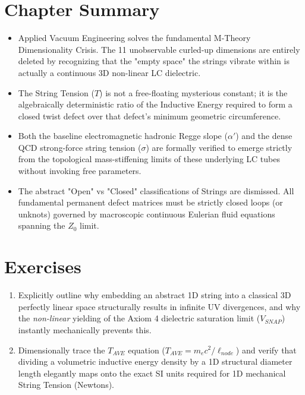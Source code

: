 \section*{Chapter Summary}
\begin{itemize}
    \item Applied Vacuum Engineering solves the fundamental M-Theory Dimensionality Crisis. The 11 unobservable curled-up dimensions are entirely deleted by recognizing that the "empty space" the strings vibrate within is actually a continuous 3D non-linear LC dielectric.
    \item The String Tension ($T$) is not a free-floating mysterious constant; it is the algebraically deterministic ratio of the Inductive Energy required to form a closed twist defect over that defect's minimum geometric circumference.
    \item Both the baseline electromagnetic hadronic Regge slope ($\alpha'$) and the dense QCD strong-force string tension ($\sigma$) are formally verified to emerge strictly from the topological mass-stiffening limits of these underlying LC tubes without invoking free parameters.
    \item The abstract "Open" vs "Closed" classifications of Strings are dismissed. All fundamental permanent defect matrices must be strictly closed loops (or unknots) governed by macroscopic continuous Eulerian fluid equations spanning the $Z_0$ limit.
\end{itemize}

\section*{Exercises}
\begin{enumerate}
    \item Explicitly outline why embedding an abstract 1D string into a classical 3D perfectly linear space structurally results in infinite UV divergences, and why the \textit{non-linear} yielding of the Axiom 4 dielectric saturation limit ($V_{SNAP}$) instantly mechanically prevents this.
    \item Dimensionally trace the $T_{AVE}$ equation ($T_{AVE} = m_e c^2 / \ell_{node}$) and verify that dividing a volumetric inductive energy density by a 1D structural diameter length elegantly maps onto the exact SI units required for 1D mechanical String Tension (Newtons).
\end{enumerate}
